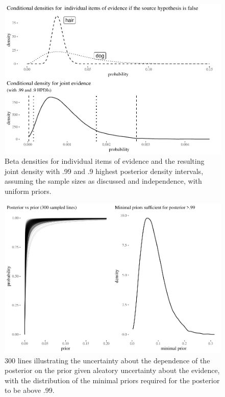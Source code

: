\documentclass[
  10pt,
  dvipsnames,enabledeprecatedfontcommands]{scrartcl}
\begin{document}
\begin{figure}[H]

\begin{center}\includegraphics[width=0.8\linewidth]{imprecision_philosophical_paper2_files/figure-latex/Figdensities-1} \end{center}
\caption{Beta densities for individual items of evidence and the resulting joint density with .99 and .9 highest posterior density intervals, assuming the sample sizes as discussed and independence, with uniform priors.}
\label{Figdensities}
\end{figure}

\begin{figure}[H]

\begin{center}\includegraphics[width=0.85\linewidth]{imprecision_philosophical_paper2_files/figure-latex/Figlines5-1} \end{center}

\caption{300 lines illustrating the uncertainty about the dependence of the posterior on the prior given aleatory uncertainty about the evidence, with the distribution of the minimal priors required for the posterior to be above .99.}

\label{Figlines}

\end{figure}
\end{document}
